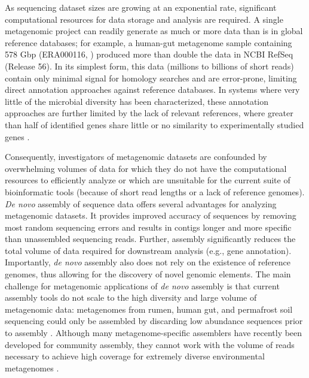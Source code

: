 \documentclass{pnastwo}
\begin{document}
\begin{article}
As sequencing dataset sizes are growing at an exponential
rate, significant computational resources for data storage and
analysis are required. A single metagenomic project can readily generate as much or more data
than is in global reference databases; for example, a human-gut metagenome sample
containing 578 Gbp (ERA000116, \cite{Qin:2010p189}) produced more than double the data in NCBI
RefSeq (Release 56).  In its simplest form, this data (millions to billions of short reads) contain only minimal signal for
homology searches and are error-prone, limiting direct annotation approaches
against reference databases.  In systems where very little of the microbial diversity has been characterized, 
these annotation approaches are further limited by the lack of relevant references, where greater than half of identified genes share little or no similarity to experimentally studied genes \cite{Arumugam:2011p735,Qin:2010p189}.  

Consequently, investigators of metagenomic datasets are confounded by
overwhelming volumes of data for which they do not have the computational resources
to efficiently analyze or which are unsuitable for the current suite of
bioinformatic tools (because of short read lengths or a lack of reference
genomes). \emph{De novo} assembly of sequence data offers several advantages for
analyzing metagenomic datasets. It provides improved accuracy of sequences by
removing most random sequencing errors and results in contigs longer and more
specific than unassembled sequencing reads. Further, assembly significantly
reduces the total volume of data required for downstream analysis (e.g., gene
annotation). Importantly, \emph{de novo} assembly also does not rely on the
existence of reference genomes, thus allowing for the discovery of novel genomic
elements. The main challenge for metagenomic applications of \emph{de novo}
assembly is that current assembly tools do not scale to the high diversity and
large volume of metagenomic data: metagenomes from rumen, human gut, and
permafrost soil sequencing could only be assembled by discarding low abundance
sequences prior to assembly
\cite{Hess:2011p686,Mackelprang:2011p1087,Qin:2010p189}. Although many
metagenome-specific assemblers have recently been developed for community
assembly, they cannot work with the volume of reads necessary to achieve high
coverage for extremely diverse environmental metagenomes
\cite{metaray, Scholz:2012p1372}.


\end{article}
\end{document}
